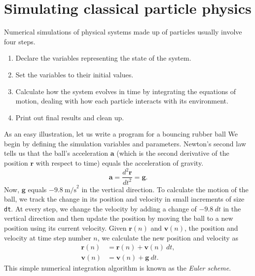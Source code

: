 \section*{\label{basic_simulation}Simulating classical particle physics}
\label{basic_simulation}

Numerical simulations of physical systems made up of particles usually involve
four steps.
\begin{enumerate}
  \item Declare the variables representing the state of the system.
  \item Set the variables to their initial values.
  \item Calculate how the system evolves in time by integrating the
        equations of motion, dealing with how each particle interacts with its
        environment.
  \item Print out final results and clean up.
\end{enumerate}

As an easy illustration, let us write a program for a bouncing rubber ball We 
begin by defining the simulation variables and parameters. Newton's second law 
tells us that the ball's acceleration $\mathbf{a}$ (which is the second 
derivative of the position $\mathbf{r}$ with respect to time) equals the 
acceleration of gravity.
\begin{equation*}
  \mathbf{a} = \frac{d^2\mathbf{r}}{dt^2} = \mathbf{g}.
\end{equation*}
Now, $\mathbf{g}$ equals $-9.8\ \mathrm{m/s}^2$ in the vertical direction. To
calculate the motion of the ball, we track the change in its position and
velocity in small increments of size \texttt{dt}. At every step, we change the
velocity by adding a change of $-9.8\ dt$ in the vertical direction and then
update the position by moving the ball to a new position using its current
velocity. Given $\mathbf{r}(n)$ and $\mathbf{v}(n)$, the position and velocity
at time step number $n$, we calculate the new position and velocity as
\begin{align*}
  \mathbf{r}(n) & = \mathbf{r}(n) + \mathbf{v}(n)\ dt, \\
  \mathbf{v}(n) & = \mathbf{v}(n) + \mathbf{g}\ dt.
\end{align*}
This simple numerical integration algorithm is known as the \textit{Euler
scheme}.

